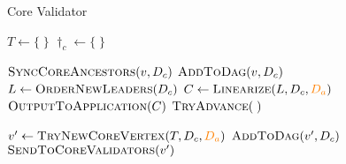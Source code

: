 \begin{algorithm}[t]
    \caption{Core Validator}
    \label{alg:core-validator}
    \scriptsize

    \begin{multicols}{2}
        \begin{algorithmic}[1]
            \State $T \gets \{ \; \}$ 
            \State $\dag_c \gets \{ \; \}$ 

            \Statex
             \label{alg:line:process-core-vertex}
            \State $\Call{SyncCoreAncestors}{v, \dag_c}$ \label{alg:line:sync-core-ancestors}
             \label{alg:line:sync-aux-ancestors}
            \State {} \label{alg:line:valid-core-vertex}
            \State $\Call{AddToDag}{v, \dag_c}$ \label{alg:line:add-to-dag}
            \State $L \gets \Call{OrderNewLeaders}{\dag_c}$ \label{alg:line:commit-leaders}
            \State $C \gets \Call{Linearize}{L, \dag_c, \change{\dag_a}}$ \label{alg:line:linearize}
            \State $\Call{OutputToApplication}{C}$
            \EndIf
            \State $\Call{TryAdvance}{\;}$
            \EndProcedure

            \Statex
             \label{alg:line:try-advance}
            \State $v' \gets \Call{TryNewCoreVertex}{T, \dag_c, \change{\dag_a}}$ \label{alg:line:try-new-core-vertex}
             \Return \EndIf
            \State $\Call{AddToDag}{v', \dag_c}$ \label{alg:line:add-to-dag-2}
            \State $\Call{SendToCoreValidators}{v'}$ \label{alg:line:send-to-core-validators}
            \EndProcedure

            \Statex

            \Statex
        \end{algorithmic}
    \end{multicols}
\end{algorithm}